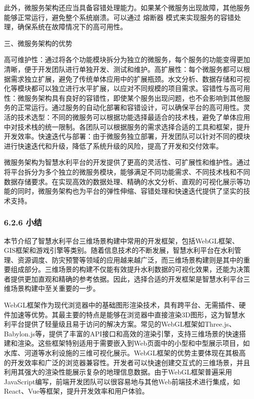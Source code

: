 此外，微服务架构还应当具备容错处理能力。如果某个微服务出现故障，其他服务能够正常运行，避免整个系统崩溃。可以通过 熔断器 模式来实现服务的容错处理，确保系统在故障情况下的高可用性。

三、微服务架构的优势

高可维护性：通过将各个功能模块拆分为独立的微服务，每个服务的功能变得更加清晰，便于开发团队进行单独开发、测试和维护。高扩展性：每个微服务都可以根据需求独立扩展，避免了传统单体应用中的扩展瓶颈。水文分析、数据存储和可视化等模块都可以独立进行水平扩展，以应对不同规模的项目需求。容错性与高可用性：微服务架构具有良好的容错性，即使某个服务出现问题，也不会影响到其他服务的正常运行。通过服务的自动化部署和容错设计，可以确保平台的高可用性。灵活的技术选型：不同的微服务可以根据功能选择最适合的技术栈，避免了单体应用中对技术栈的统一限制。各团队可以根据服务的需求选择合适的工具和框架，提升开发效率。快速迭代与部署：由于微服务独立部署，开发团队可以针对不同的模块进行快速迭代和升级，降低了系统升级的风险，提高了开发和交付效率。

微服务架构为智慧水利平台的开发提供了更高的灵活性、可扩展性和维护性。通过将平台拆分为多个独立的微服务模块，能够满足不同功能需求、不同技术栈和不同数据存储要求。在实现高效的数据处理、精确的水文分析、直观的可视化展示等功能的同时，微服务架构也为平台的弹性伸缩、容错处理和快速迭代提供了坚实的技术支持。

\hypertarget{ux5c0fux7ed3-1}{%
\subsubsection{6.2.6 小结}\label{ux5c0fux7ed3-1}}

本节介绍了智慧水利平台三维场景构建中常用的开发框架，包括WebGL框架、GIS框架和游戏引擎等类别。随着信息技术的不断发展，智慧水利平台在水利管理、资源调度、防灾预警等领域的应用越来越广泛，而三维场景构建则是其中的重要组成部分。三维场景的构建不仅能有效提升水利数据的可视化效果，还能为决策者提供更加直观和精确的参考依据。因此，选择合适的开发框架是智慧水利平台三维场景构建中至关重要的一步。

WebGL框架作为现代浏览器中的基础图形渲染技术，具有跨平台、无需插件、硬件加速等优势。其最主要的特点是能够在浏览器中直接渲染3D图形，这为智慧水利平台提供了轻量级且易于访问的解决方案。常见的WebGL框架如Three.js、Babylon.js等，提供了丰富的API接口和高效的渲染引擎，支持三维场景的快速搭建和渲染。这些框架特别适用于需要嵌入到Web页面中的小型和中型展示项目，如水库、河道等水利设施的三维可视化展示。WebGL框架的优势主要体现在其极高的开发效率和广泛的浏览器兼容性。开发者可以快速创建交互式的三维场景，并且利用其强大的渲染性能展示复杂的地理信息数据。由于WebGL框架普遍采用JavaScript编写，前端开发团队可以很容易地与其他Web前端技术进行集成，如React、Vue等框架，提升开发效率和用户体验。

